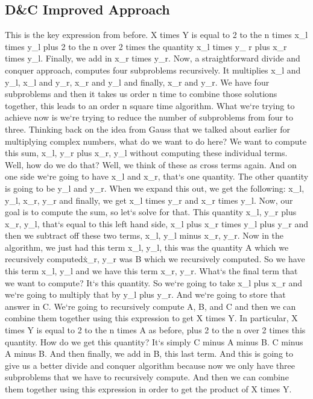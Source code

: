 \subsection{D\&C  Improved Approach}
This is the key expression from before.
X times Y is equal to 2 to the n times x\_l times y\_l plus 2 to the n over 2 times the quantity x\_l times y\_ r plus x\_r times y\_l.
Finally, we add in x\_r times y\_r.
Now, a straightforward divide and conquer approach, computes four subproblems recursively.
It multiplies x\_l and y\_l, x\_l and y\_r, x\_r and y\_l and finally, x\_r and y\_r.
We have four subproblems and then it takes us order n time to combine those solutions together, this leads to an order n square time algorithm.
What we`re trying to achieve now is we`re trying to reduce the number of subproblems from four to three.
Thinking back on the idea from Gauss that we talked about earlier for multiplying complex numbers, what do we want to do here? We want to compute this sum, x\_l, y\_r plus x\_r, y\_l without computing these individual terms.
Well, how do we do that? Well, we think of these as cross terms again.
And on one side we`re going to have x\_l and x\_r, that`s one quantity.
The other quantity is going to be y\_l and y\_r.
When we expand this out, we get the following: x\_l, y\_l, x\_r, y\_r and finally, we get x\_l times y\_r and x\_r times y\_l.
Now, our goal is to compute the sum, so let`s solve for that.
This quantity x\_l, y\_r plus x\_r, y\_l, that`s equal to this left hand side, x\_l plus x\_r times y\_l plus y\_r and then we subtract off these two terms, x\_l, y\_l minus x\_r, y\_r.
Now in the algorithm, we just had this term x\_l, y\_l, this was the quantity A which we recursively computed\. x\_r, y\_r was B which we recursively computed.
So we have this term x\_l, y\_l and we have this term x\_r, y\_r.
What`s the final term that we want to compute? It`s this quantity.
So we`re going to take x\_l plus x\_r and we`re going to multiply that by y\_l plus y\_r.
And we`re going to store that answer in C\@.
We`re going to recursively compute A, B, and C and then we can combine them together using this expression to get X times Y\@.
In particular, X times Y is equal to 2 to the n times A as before, plus 2 to the n over 2 times this quantity.
How do we get this quantity? It`s simply C minus A minus B\@.
C minus A minus B\@.
And then finally, we add in B, this last term.
And this is going to give us a better divide and conquer algorithm because now we only have three subproblems that we have to recursively compute.
And then we can combine them together using this expression in order to get the product of X times Y\@.

